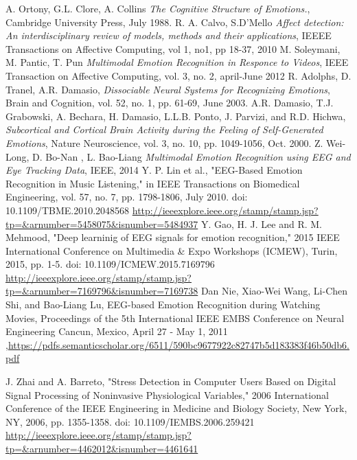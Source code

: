 \documentclass[10pt,journal,compsoc,twoside]{IEEEtran}
\begin{document}
\begin{thebibliography}{99}
A. Ortony, G.L. Clore, A. Collins \textit{The Cognitive Structure of Emotions.}, Cambridge University Press, July 1988.
 R. A. Calvo, S.D'Mello \textit{Affect detection: An interdisciplinary review of models, methods and their applications}, IEEEE Transactions on Affective Computing, vol 1, no1, pp 18-37, 2010
 M. Soleymani, M. Pantic, T. Pun \textit{Multimodal Emotion Recognition in Responce to Videos}, IEEE Transaction on Affective Computing, vol. 3, no. 2, april-June 2012
R. Adolphs, D. Tranel, A.R. Damasio, \textit{Dissociable Neural Systems for Recognizing Emotions}, Brain and Cognition, vol. 52, no. 1, pp. 61-69, June 2003.
 A.R. Damasio, T.J. Grabowski, A. Bechara, H. Damasio, L.L.B.
Ponto, J. Parvizi, and R.D. Hichwa, \textit{Subcortical and Cortical Brain
Activity during the Feeling of Self-Generated Emotions}, Nature
Neuroscience, vol. 3, no. 10, pp. 1049-1056, Oct. 2000.
 Z. Wei-Long, D. Bo-Nan , L. Bao-Liang 
\textit{Multimodal Emotion Recognition using EEG and Eye Tracking Data}, IEEE, 2014
Y. P. Lin et al., "EEG-Based Emotion Recognition in Music Listening," in IEEE Transactions on Biomedical Engineering, vol. 57, no. 7, pp. 1798-1806, July 2010.
doi: 10.1109/TBME.2010.2048568
\url{http://ieeexplore.ieee.org/stamp/stamp.jsp?tp=&arnumber=5458075&isnumber=5484937}
Y. Gao, H. J. Lee and R. M. Mehmood, "Deep learninig of EEG signals for emotion recognition," 2015 IEEE International Conference on Multimedia \& Expo Workshops (ICMEW), Turin, 2015, pp. 1-5.
doi: 10.1109/ICMEW.2015.7169796
\url{http://ieeexplore.ieee.org/stamp/stamp.jsp?tp=&arnumber=7169796&isnumber=7169738}
Dan Nie, Xiao-Wei Wang, Li-Chen Shi, and Bao-Liang Lu, EEG-based Emotion Recognition during Watching Movies, Proceedings of the 5th International IEEE EMBS Conference on Neural Engineering Cancun, Mexico, April 27 - May 1, 2011 ,\url{https://pdfs.semanticscholar.org/6511/590bc9677922c82747b5d183383f46b50db6.pdf}

J. Zhai and A. Barreto, "Stress Detection in Computer Users Based on Digital Signal Processing of Noninvasive Physiological Variables," 2006 International Conference of the IEEE Engineering in Medicine and Biology Society, New York, NY, 2006, pp. 1355-1358.
doi: 10.1109/IEMBS.2006.259421
\url{ http://ieeexplore.ieee.org/stamp/stamp.jsp?tp=&arnumber=4462012&isnumber=4461641}



\end{thebibliography}
\end{document}
